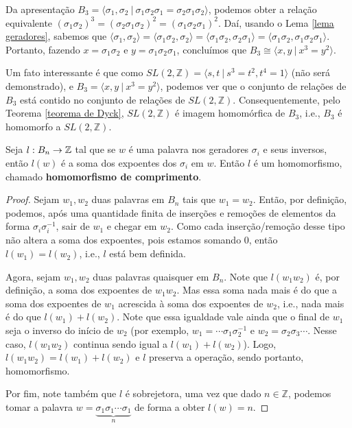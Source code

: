 	\par\vspace{0.3cm} Da apresentação $B_3 = \langle \sigma_1,\sigma_2 \ | \ \sigma_1\sigma_2\sigma_1 
	= \sigma_2\sigma_1\sigma_2 \rangle$, podemos obter a relação equivalente 
	$(\sigma_1\sigma_2)^3 = (\sigma_2\sigma_1\sigma_2)^2 = (\sigma_1\sigma_2\sigma_1)^2$. Daí, usando 
	o Lema \ref{lema geradores}, sabemos que $\langle \sigma_1,\sigma_2 \rangle 
	= \langle \sigma_1\sigma_2,\sigma_2 \rangle = \langle \sigma_1\sigma_2, \sigma_2\sigma_1 \rangle 
	= \langle \sigma_1\sigma_2, \sigma_1\sigma_2\sigma_1 \rangle$. Portanto, fazendo 
	$x = \sigma_1\sigma_2$ e $y = \sigma_1\sigma_2\sigma_1$, concluímos que 
	$B_3 \cong \langle x,y \ | \ x^3=y^2 \rangle$.
	\begin{remark}
		Um fato interessante é que como $SL(2,\mathbb{Z}) = \langle s,t \ | \ s^3 = t^2, t^4 = 1 \rangle$ 
		(não será demonstrado), e $B_3 = \langle x,y \ | \ x^3 = y^2 \rangle$, podemos ver que o conjunto de 
		relações de $B_3$ está contido no conjunto de relações de $SL(2,\mathbb{Z})$. Consequentemente, 
		pelo Teorema \ref{teorema de Dyck}, $SL(2,\mathbb{Z})$ é imagem homomórfica de $B_3$, i.e., 
		$B_3$ é homomorfo a $SL(2,\mathbb{Z})$. 
	\end{remark}
	\begin{lemma}
	\label{homomorfismo de comprimento}
		Seja $l:B_n \to \mathbb{Z}$ tal que se $w$ é uma palavra nos geradores $\sigma_i$ e seus inversos, 
		então $l(w)$ é a soma dos expoentes 
		dos $\sigma_i$ em $w$. Então $l$ é um homomorfismo, chamado {\bf homomorfismo de comprimento}.
	\end{lemma}
	\begin{proof}
		Sejam $w_1,w_2$ duas palavras em $B_n$ tais que $w_1=w_2$. Então, por definição, podemos, 
		após uma quantidade finita de inserções e remoções de elementos da forma $\sigma_i\sigma_i^{-1}$, 
		sair de $w_1$ e chegar em $w_2$. Como cada inserção/remoção desse tipo não altera a soma dos expoentes,
		pois estamos somando 0, então $l(w_1)=l(w_2)$, i.e., $l$ está bem definida. 
		
		\par\vspace{0.3cm} Agora, sejam $w_1,w_2$ duas palavras quaisquer em $B_n$. Note que $l(w_1w_2)$ é, 
		por definição, a soma dos expoentes de $w_1w_2$. Mas essa soma nada mais é do que a soma dos expoentes 
		de $w_1$ acrescida à soma dos expoentes de $w_2$, i.e., nada mais é do que $l(w_1)+l(w_2)$. Note que 
		essa igualdade vale ainda que o final de $w_1$ seja o inverso do início de $w_2$ (por exemplo, 
		$w_1 = \cdots\sigma_1\sigma_2^{-1}$ e $w_2 = \sigma_2\sigma_3\cdots$. Nesse caso, $l(w_1w_2)$ 
		continua sendo igual a $l(w_1) + l(w_2)$). Logo, $l(w_1w_2)=l(w_1)+l(w_2)$ e $l$ preserva a operação, 
		sendo portanto, homomorfismo.
		
		\par\vspace{0.3cm} Por fim, note também que $l$ é sobrejetora, uma vez que dado $n\in\mathbb{Z}$, 
		podemos tomar a palavra $w = \underbrace{\sigma_1\sigma_1\cdots\sigma_1}_{n}$ de forma a obter $l(w) = n$.
	\end{proof}

